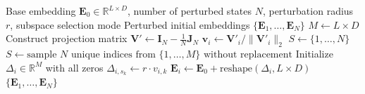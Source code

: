 \begin{algorithm}[H]
\caption{Regular Simplex Initial Condition Generation}
\label{alg:simplex_perturbation}
\begin{algorithmic}[1]
\REQUIRE Base embedding $\mathbf{E}_0 \in \mathbb{R}^{L \times D}$, number of perturbed states $N$, perturbation radius $r$, subspace selection mode
\ENSURE Perturbed initial embeddings $\{\mathbf{E}_1, \dots, \mathbf{E}_N\}$
\STATE $M \leftarrow L \times D$
\STATE Construct projection matrix $\mathbf{V}' \leftarrow \mathbf{I}_N - \frac{1}{N}\mathbf{J}_N$ 
    \STATE $\mathbf{v}_i \leftarrow \mathbf{V}'_i / \|\mathbf{V}'_i\|_2$ 
\ENDFOR
{}
    \STATE $S \leftarrow \{1, \dots, N\}$
\ELSE
    \STATE $S \leftarrow \text{sample } N \text{ unique indices from } \{1, \dots, M\} \text{ without replacement}$
\ENDIF
{}
    \STATE Initialize $\Delta_i \in \mathbb{R}^M$ with all zeros
        \STATE $\Delta_{i, s_k} \leftarrow r \cdot v_{i, k}$
    \ENDFOR
    \STATE $\mathbf{E}_i \leftarrow \mathbf{E}_0 + \text{reshape}(\Delta_i, L \times D)$
\ENDFOR
\RETURN $\{\mathbf{E}_1, \dots, \mathbf{E}_N\}$
\end{algorithmic}
\end{algorithm}
